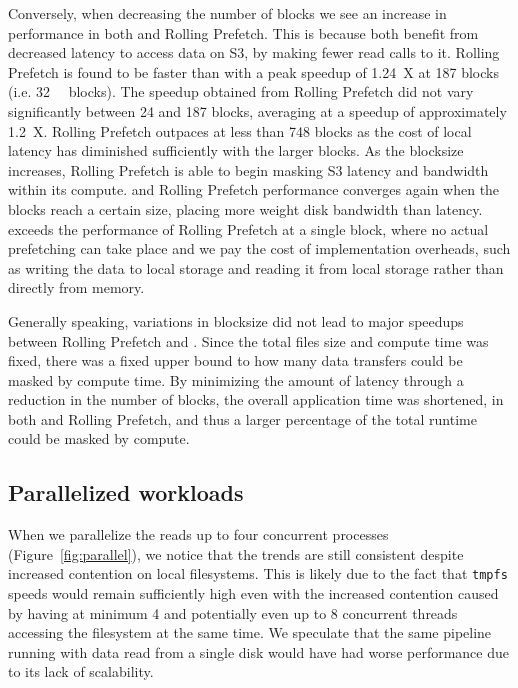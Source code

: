 Conversely, when decreasing the number of blocks we see an increase in
performance in both \sfs and Rolling Prefetch. This is because both benefit from
decreased latency to access data on S3, by making fewer read calls to it.
Rolling Prefetch is found to be faster than \sfs with a peak speedup of 1.24~X
at 187 blocks (i.e. \SI{32}{\mebi\byte} blocks). The speedup obtained from
Rolling Prefetch did not vary significantly between 24 and 187 blocks, averaging
at a speedup of approximately 1.2~X. Rolling Prefetch outpaces \sfs at less than
748 blocks as the cost of local latency has diminished sufficiently with the
larger blocks. As the blocksize increases, Rolling Prefetch is able to begin
masking S3 latency and bandwidth within its compute.
\sfs and Rolling Prefetch performance converges again when the blocks reach a
certain size, placing more weight disk bandwidth than latency. \sfs exceeds the
performance of Rolling Prefetch at a single block, where no actual prefetching
can take place and we pay the cost of implementation overheads, such as writing
the data to local storage and reading it from local storage rather than directly
from memory.

Generally speaking, variations in blocksize did not lead to major speedups
between Rolling Prefetch and \sfs. Since the total files size and compute time
was fixed, there was a fixed upper bound to how many data transfers could be
masked by compute time. By minimizing the amount of latency through a reduction
in the number of blocks, the overall application time was shortened, in both
\sfs and Rolling Prefetch, and thus a larger percentage of the total runtime
could be masked by compute.

\subsection{Parallelized workloads}
When we parallelize the reads up to four concurrent processes
(Figure~\ref{fig:parallel}), we notice that the trends are still consistent
despite increased contention on local filesystems. This is likely due to the
fact that \texttt{tmpfs} speeds would remain sufficiently high even with the
increased contention caused by having at minimum 4 and potentially even up to 8
concurrent threads accessing the filesystem at the same time. We speculate that
the same pipeline running with data read from a single disk would have had worse
performance due to its lack of scalability.

